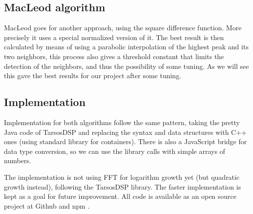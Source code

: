 \subsection{MacLeod algorithm}
MacLeod \cite{MacLeodArticle} goes for another approach, using the square difference
function. More precisely it uses a special normalized version of it. The best result
is then calculated by means of using a parabolic interpolation of the highest
peak and its two neighbors, this process also gives a threshold constant that limits
the detection of the neighbors, and thus the possibility of some tuning. As we will
see this gave the best results for our project after some tuning.

\subsection{Implementation}
\label{pitch-detection-implementation}
Implementation for both algorithms follow the same pattern, taking the pretty
Java code of TarsosDSP \cite{TarsosDSP} and replacing the syntax and data structures
with C++ ones (using standard library for containers). There is also a JavaScript bridge
for data type conversion, so we can use the library calls with simple arrays of numbers.

The implementation is not using FFT for logarithm growth yet (but quadratic growth
instead), following the TarsosDSP library. The faster implementation is kept as
a goal for future improvement. All code is available as an open source project at
Github and npm \cite{node-pitchfinder}.
